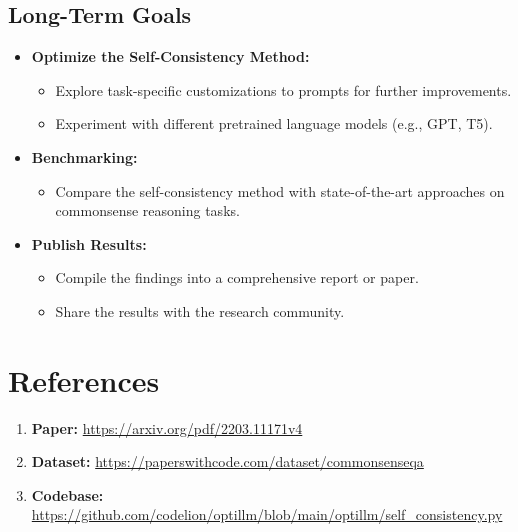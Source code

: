 \documentclass[a4paper,9pt]{article}
\begin{document}
\subsection*{Long-Term Goals}
\begin{itemize}
    \item \textbf{Optimize the Self-Consistency Method:}
    \begin{itemize}
        \item Explore task-specific customizations to prompts for further improvements.
        \item Experiment with different pretrained language models (e.g., GPT, T5).
    \end{itemize}
    \item \textbf{Benchmarking:}
    \begin{itemize}
        \item Compare the self-consistency method with state-of-the-art approaches on commonsense reasoning tasks.
    \end{itemize}
    \item \textbf{Publish Results:}
    \begin{itemize}
        \item Compile the findings into a comprehensive report or paper.
        \item Share the results with the research community.
    \end{itemize}
\end{itemize}

\section*{References}
\begin{enumerate}
    \item \textbf{Paper:} \url{https://arxiv.org/pdf/2203.11171v4}
    \item \textbf{Dataset:} \url{https://paperswithcode.com/dataset/commonsenseqa}
    \item \textbf{Codebase:} \url{https://github.com/codelion/optillm/blob/main/optillm/self_consistency.py}
\end{enumerate}
\end{document}
